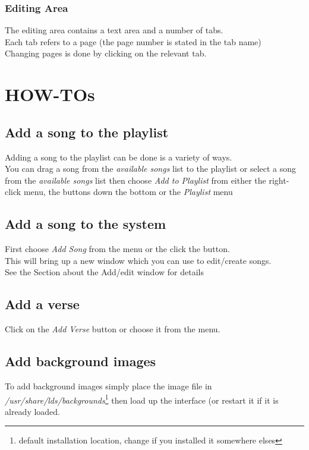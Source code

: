 \documentclass[11pt,twoside]{book}
\begin{document}
\subsection{Editing Area}
	The editing area contains a text area and a number of tabs.\\
	Each tab refers to a page (the page number is stated in the tab name)\\
	Changing pages is done by clicking on the relevant tab.\\

%
%

\chapter{HOW-TOs}

\section{Add a song to the playlist}
Adding a song to the playlist can be done is a variety of ways.\\
You can drag a song from the \emph{available songs} list to the playlist or select a song from the \emph{available songs} list then choose \emph{Add to Playlist} from either the right-click menu, the buttons down the bottom or the \emph{Playlist} menu

\section{Add a song to the system}
First choose \emph{Add Song} from the menu or the click the button.\\
This will bring up a new window which you can use to edit/create songs.\\
See the Section about the Add/edit window for details

\section{Add a verse}
Click on the \emph{Add Verse} button or choose it from the menu.

\section{Add background images}
To add background images simply place the image file in \emph{/usr/share/lds/backgrounds}\footnote{default installation location, change if you installed it somewhere elses} then load up the interface (or restart it if it is already loaded.
\end{document}
